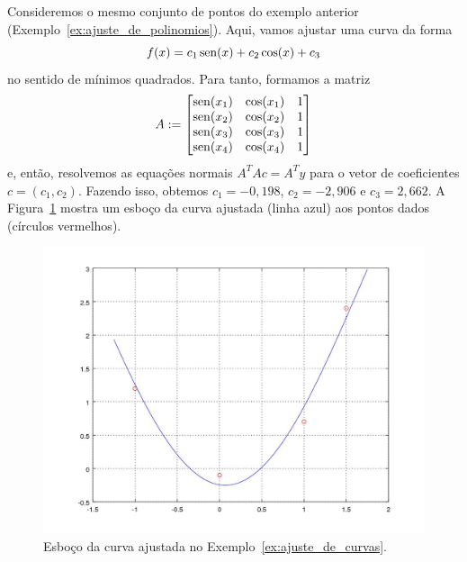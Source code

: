 \begin{ex}\label{ex:ajuste_de_curvas}
  Consideremos o mesmo conjunto de pontos do exemplo anterior (Exemplo~\ref{ex:ajuste_de_polinomios}). Aqui, vamos ajustar uma curva da forma
  \begin{equation}
    f(x) = c_1\operatorname{sen}(x) + c_2\cos(x) + c_3
  \end{equation}
no sentido de mínimos quadrados. Para tanto, formamos a matriz
\begin{equation}
  A :=
  \begin{bmatrix}
    \operatorname{sen}(x_1) & \cos(x_1) & 1 \\
    \operatorname{sen}(x_2) & \cos(x_2) & 1 \\
    \operatorname{sen}(x_3) & \cos(x_3) & 1 \\
    \operatorname{sen}(x_4) & \cos(x_4) & 1
  \end{bmatrix}
\end{equation}
  e, então, resolvemos as equações normais $A^TAc = A^Ty$ para o vetor de coeficientes $c=(c_1, c_2)$. Fazendo isso, obtemos $c_1=-0,198$, $c_2=-2,906$ e $c_3=2,662$. A Figura~\ref{fig:ex_ajuste_de_curvas} mostra um esboço da curva ajustada (linha azul) aos pontos dados (círculos vermelhos).

  \begin{figure}[h]
    \centering
    \includegraphics[width=\textwidth]{cap_ajuste/dados/ex_mq_curvas/ex_mq_curvas}
    \caption{Esboço da curva ajustada no Exemplo~\ref{ex:ajuste_de_curvas}.}
    \label{fig:ex_ajuste_de_curvas}
  \end{figure}





\end{ex}

